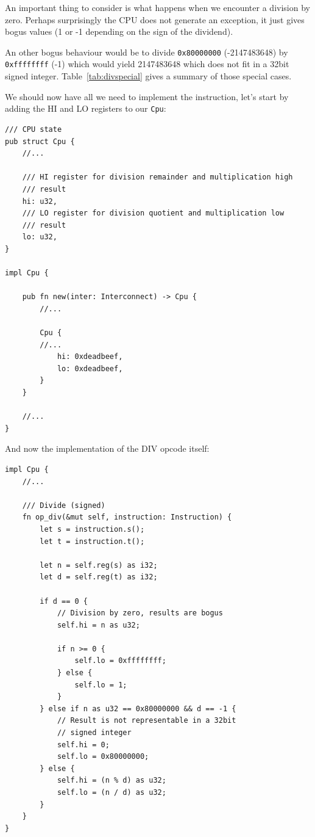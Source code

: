 \documentclass[a4paper]{article}
\newcommand{\code}[1] {\texttt{#1}}
\begin{document}
An important thing to consider is what happens when we encounter a
division by zero. Perhaps surprisingly the CPU does not generate an
exception, it just gives bogus values (1 or -1 depending on the
sign of the dividend).

An other bogus behaviour would be to divide \code{0x80000000}
(-2147483648) by \code{0xffffffff} (-1) which would yield 2147483648
which does not fit in a 32bit signed
integer. Table~\ref{tab:divspecial} gives a summary of those special
cases.

We should now have all we need to implement the instruction, let's
start by adding the HI and LO registers to our \code{Cpu}:

\begin{lstlisting}
/// CPU state
pub struct Cpu {
    //...

    /// HI register for division remainder and multiplication high
    /// result
    hi: u32,
    /// LO register for division quotient and multiplication low
    /// result
    lo: u32,
}

impl Cpu {

    pub fn new(inter: Interconnect) -> Cpu {
        //...

        Cpu {
	    //...
            hi: 0xdeadbeef,
            lo: 0xdeadbeef,
        }
    }

    //...
}
\end{lstlisting}

And now the implementation of the DIV opcode itself:

\begin{lstlisting}
impl Cpu {
    //...

    /// Divide (signed)
    fn op_div(&mut self, instruction: Instruction) {
        let s = instruction.s();
        let t = instruction.t();

        let n = self.reg(s) as i32;
        let d = self.reg(t) as i32;

        if d == 0 {
            // Division by zero, results are bogus
            self.hi = n as u32;

            if n >= 0 {
                self.lo = 0xffffffff;
            } else {
                self.lo = 1;
            }
        } else if n as u32 == 0x80000000 && d == -1 {
            // Result is not representable in a 32bit
            // signed integer
            self.hi = 0;
            self.lo = 0x80000000;
        } else {
            self.hi = (n % d) as u32;
            self.lo = (n / d) as u32;
        }
    }
}
\end{lstlisting}
\end{document}
